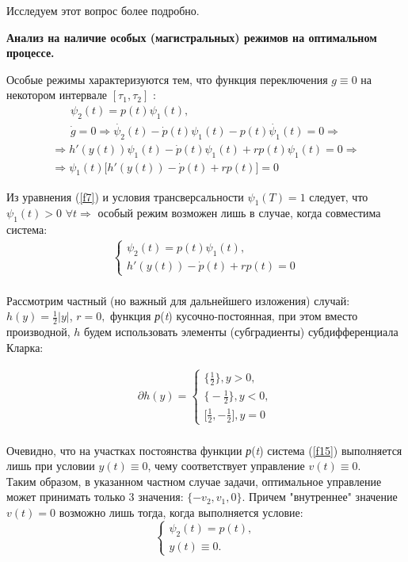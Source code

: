 Исследуем этот вопрос более подробно.

\textbf{Анализ на наличие особых (магистральных) режимов на оптимальном процессе.}

Особые режимы характеризуются тем, что функция переключения $g \equiv 0$ на некотором интервале $[\tau_1, \tau_2]$ :
\begin{gather*}
  \psi_2 (t) = p(t) \psi_1 (t),\\
   \Dot{g} = 0 \Rightarrow  \Dot{\psi_2}(t) - \Dot{p}(t) \psi_1 (t) - p(t) \Dot{\psi_1}(t) = 0 \Rightarrow 
   \end{gather*}
   \begin{gather*}
  \Rightarrow h'(y(t)) \psi_1 (t) -   \Dot{p}(t) \psi_1 (t) + r p(t) {\psi_1}(t) = 0 \Rightarrow \\
  \Rightarrow  \psi_1 (t) \big[  h'(y(t)) -   \Dot{p}(t) + r p(t) \big] = 0 
\end{gather*}



Из уравнения (\ref{f7}) и условия трансверсальности $\psi_1(T)= 1$ следует, что $\psi_1(t)>0$  $ \forall t  \Rightarrow$ особый режим возможен лишь в случае, когда совместима система:\\
\begin{align}
 \begin{cases}
\psi_2(t) = p(t)\psi_1(t),  \\
h'(y(t)) - \Dot{p}(t)+r p(t) = 0
\end{cases}
\end{align}\\

Рассмотрим частный (но важный для дальнейшего изложения) случай:  $ {h(y)} = \frac{1}{2}|y|$, $ {r} = 0, $ функция \emph {р}(\emph{t}) кусочно-постоянная, при этом вместо производной, $h$ будем использовать элементы (субградиенты) субдифференциала Кларка:

\begin{align} \label{f15}
\partial h(y) =
 \begin{cases}
 \big\{\frac{1}{2}\big\}, y>0,  \\
 \big\{-\frac{1}{2}\big\}, y<0, \\
\big[\frac{1}{2}, -\frac{1}{2} \big], y=0
\end{cases}
\end{align}\\



Очевидно, что на участках постоянства функции \emph {р}(\emph{t}) система (\ref{f15}) выполняется лишь при условии $ y(t) \equiv 0$, чему соответствует управление $ v(t) \equiv 0$.\\
Таким образом, в указанном частном случае задачи, оптимальное управление может принимать только 3 значения: $ \{ - v_2, v_1, 0\}$. Причем "внутреннее" значение $v(t) = 0$ возможно лишь тогда, когда выполняется условие:
\begin{displaymath}
\left\{ \begin{array}{ll}
 \psi_2(t) = p(t),\\
 y(t) \equiv 0.
  \end{array} \right.
\end{displaymath}

